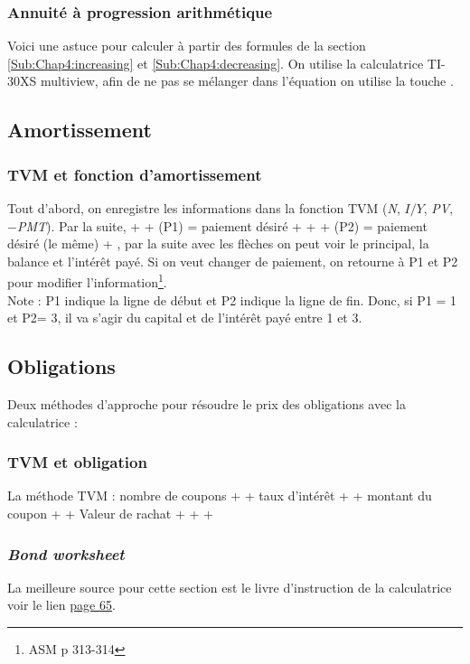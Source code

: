 \subsubsection{Annuité à progression arithmétique}
\label{annuité et TI-30XS}
Voici une astuce pour calculer à partir des formules de la section \ref{Sub:Chap4:increasing} et \ref{Sub:Chap4:decreasing}. On utilise la calculatrice TI-30XS multiview, afin de ne pas se mélanger dans l'équation on utilise la touche .

\subsection{Amortissement}
\label{Amortissement}

\subsubsection{TVM et fonction d'amortissement}
\label{ann:chap:amortissement}
Tout d'abord, on enregistre les informations dans la fonction TVM (\textit{N}, \textit{$I/Y$}, \textit{PV}, \textit{$-$PMT}). Par la suite,  +  + (P1) = paiement désiré +  + \fbox{$\downarrow$} + (P2) = paiement désiré (le même) + , par la suite avec les flèches on peut voir le principal, la balance et l'intérêt payé. Si on veut changer de paiement, on retourne à P1 et P2 pour modifier l'information\footnote{ASM p 313-314}. 
\\Note : P1 indique la ligne de début et P2 indique la ligne de fin. Donc, si P1 = 1 et P2= 3, il va s'agir du capital et de l'intérêt payé entre 1 et 3.

\subsection{Obligations}
\label{obligation}

Deux méthodes d'approche pour résoudre le prix des obligations avec la calculatrice :

\subsubsection{TVM et obligation}
\label{anex:TVM et obligation}

La méthode TVM :  nombre de coupons +  + taux d'intérêt +  + montant du coupon +  + Valeur de rachat +  +  + 

\subsubsection{\textit{Bond worksheet}}
\label{anex:bond worksheet}

La meilleure source pour cette section est le livre d'instruction de la calculatrice voir le lien \href{https://drive.google.com/open?id=0B6kXivc6X9LIMXI4T1QtcTFQNzA}{page 65}. 
